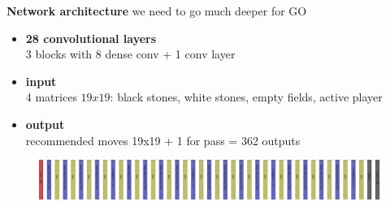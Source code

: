 \documentclass[xcolor=dvipsnames]{beamer}
\begin{document}
\begin{frame}{\bf Network architecture}
we need to go much deeper for GO
\begin{itemize}
  \item {\bf 28 convolutional layers} \\ 3 blocks with 8 dense conv + 1 conv layer
  \item {\bf input} \\ 4 matrices $19x19$: black stones, white stones, empty fields, active player
  \item {\bf output} \\ recommended moves 19x19 + 1 for pass = 362 outputs

\end{itemize}

  \begin{figure}[!htb]
    \centering
    \includegraphics[scale=0.049]{../../pictures/go_deep_cnn_architecture.png}
  \end{figure}

\end{frame}
\end{document}
